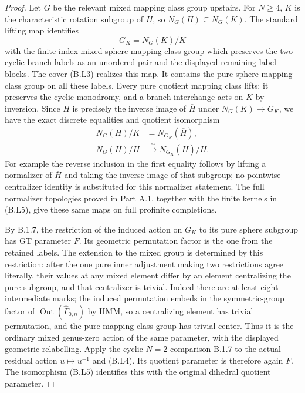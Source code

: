 \begin{proof}
Let $G$ be the relevant mixed mapping class group upstairs.
For $N\geq4$, $K$ is the characteristic rotation subgroup of
$H$, so $N_G(H)\subseteq N_G(K)$.  The standard lifting map
identifies
\[
 G_K=N_G(K)/K
\]
with the finite-index mixed sphere mapping class group which
preserves the two cyclic branch labels as an unordered pair
and the displayed remaining label blocks.  The cover (B.L3)
realizes this map.  It contains the pure sphere mapping class
group on all these labels.  Every pure quotient mapping
class lifts: it preserves the cyclic monodromy, and a branch
interchange acts on $K$ by inversion.  Since $H$ is precisely
the inverse image of $\overline H$ under $N_G(K)\to G_K$, we
have the exact discrete equalities and quotient isomorphism
\[
 \begin{split}
 N_G(H)/K&=N_{G_K}(\overline H),\\
 N_G(H)/H&\xrightarrow{\ \sim\ }
                      N_{G_K}(\overline H)/\overline H.
 \end{split}                                                \tag{B.L5}
\]
For example the reverse inclusion in the first equality
follows by lifting a normalizer of $\overline H$ and taking
the inverse image of that subgroup; no pointwise-centralizer
identity is substituted for this normalizer statement.
The full normalizer topologies proved in Part A.1, together
with the finite kernels in (B.L5), give these same maps on
full profinite completions.

By B.1.7, the restriction of the induced action on $G_K$ to
its pure sphere subgroup has GT parameter $F$.  Its geometric
permutation factor is the one from the retained labels.  The
extension to the mixed group is determined by this restriction:
after the one pure inner adjustment making two restrictions
agree literally, their values at any mixed element differ by
an element centralizing the pure subgroup, and that centralizer
is trivial.  Indeed there are at least eight intermediate marks;
the induced permutation embeds in the symmetric-group factor of
$\operatorname{Out}(\widehat\Gamma_{0,n})$ by HMM, so a
centralizing element has trivial permutation, and the pure
mapping class group has trivial center.  Thus it is the ordinary mixed genus-zero action
of the same parameter, with the displayed geometric relabelling.
Apply the cyclic $N=2$ comparison B.1.7 to the actual residual
action $u\mapsto u^{-1}$ and (B.L4).  Its quotient parameter
is therefore again $F$.  The isomorphism (B.L5) identifies
this with the original dihedral quotient parameter.


\end{proof}

